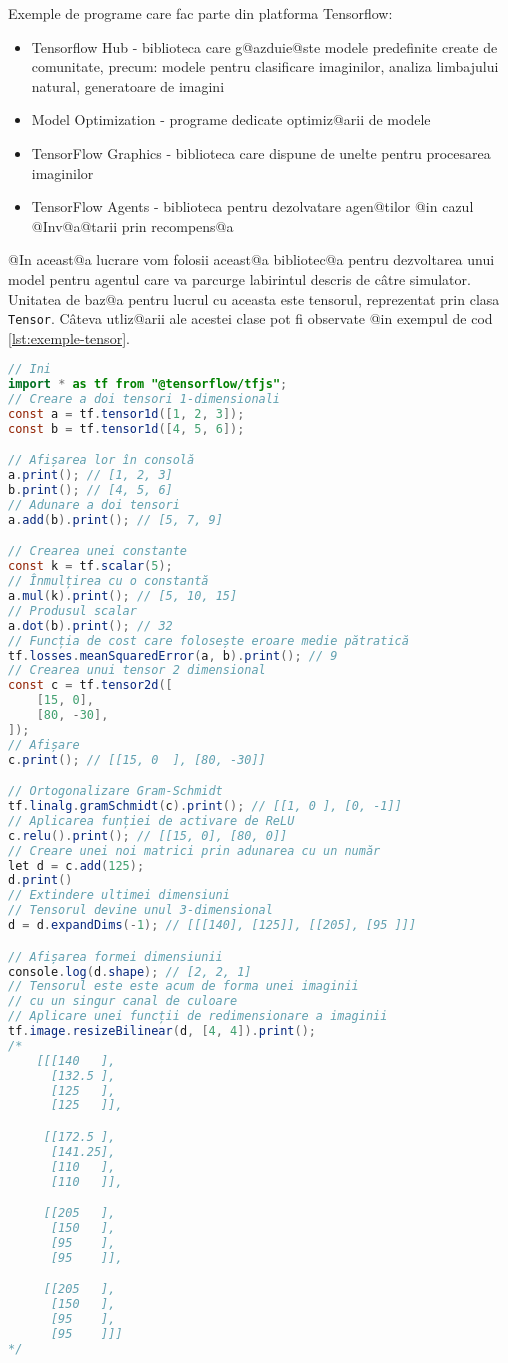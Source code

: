 Exemple de programe care fac parte din platforma Tensorflow:
\begin{itemize}
	\item Tensorflow Hub - biblioteca care g@azduie@ste modele predefinite create de comunitate, precum: modele pentru clasificare imaginilor, analiza limbajului natural, generatoare de imagini
	\item Model Optimization - programe dedicate optimiz@arii de modele
	\item TensorFlow Graphics - biblioteca care dispune de unelte pentru procesarea imaginilor
	\item TensorFlow Agents - biblioteca pentru dezolvatare agen@tilor @in cazul @Inv@a@tarii prin recompens@a
\end{itemize}

@In aceast@a lucrare vom folosii aceast@a bibliotec@a pentru dezvoltarea unui model pentru agentul care va parcurge labirintul descris de c\^ atre simulator. Unitatea de baz@a pentru lucrul cu aceasta este tensorul, reprezentat prin clasa \texttt{Tensor}. C\^ ateva utliz@arii ale acestei clase pot fi observate @in exempul de cod \ref{lst:exemple-tensor}.

\begin{lstlisting}[language=Java, caption=Exemple de folosire a bibliotecii Tensorflow, label={lst:exemple-tensor}]
// Ini	
import * as tf from "@tensorflow/tfjs";
// Creare a doi tensori 1-dimensionali
const a = tf.tensor1d([1, 2, 3]);
const b = tf.tensor1d([4, 5, 6]);

// Afișarea lor în consolă
a.print(); // [1, 2, 3]
b.print(); // [4, 5, 6]
// Adunare a doi tensori
a.add(b).print(); // [5, 7, 9]

// Crearea unei constante
const k = tf.scalar(5);
// Înmulțirea cu o constantă
a.mul(k).print(); // [5, 10, 15]
// Produsul scalar
a.dot(b).print(); // 32
// Funcția de cost care folosește eroare medie pătratică
tf.losses.meanSquaredError(a, b).print(); // 9
// Crearea unui tensor 2 dimensional
const c = tf.tensor2d([
    [15, 0],
    [80, -30],
]);
// Afișare
c.print(); // [[15, 0  ], [80, -30]]

// Ortogonalizare Gram-Schmidt
tf.linalg.gramSchmidt(c).print(); // [[1, 0 ], [0, -1]]
// Aplicarea funției de activare de ReLU
c.relu().print(); // [[15, 0], [80, 0]]
// Creare unei noi matrici prin adunarea cu un număr
let d = c.add(125);
d.print()
// Extindere ultimei dimensiuni
// Tensorul devine unul 3-dimensional
d = d.expandDims(-1); // [[[140], [125]], [[205], [95 ]]]

// Afișarea formei dimensiunii
console.log(d.shape); // [2, 2, 1]
// Tensorul este este acum de forma unei imaginii
// cu un singur canal de culoare
// Aplicare unei funcții de redimensionare a imaginii
tf.image.resizeBilinear(d, [4, 4]).print();
/*
    [[[140   ],
      [132.5 ],
      [125   ],
      [125   ]],

     [[172.5 ],
      [141.25],
      [110   ],
      [110   ]],

     [[205   ],
      [150   ],
      [95    ],
      [95    ]],

     [[205   ],
      [150   ],
      [95    ],
      [95    ]]]
*/	
\end{lstlisting}

